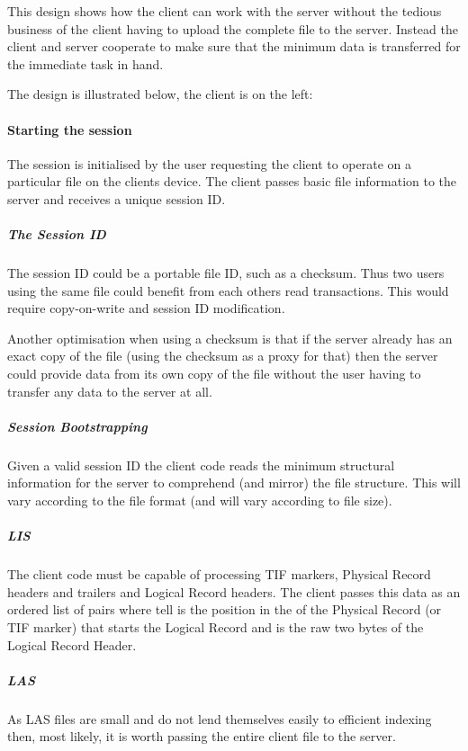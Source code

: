 \documentclass[letterpaper,10pt,english]{sphinxmanual}
\begin{document}
This design shows how the client can work with the server without the tedious business of the client having to upload the complete file to the server. Instead the client and server cooperate to make sure that the minimum data is transferred for the immediate task in hand.

The design is illustrated below, the client is on the left:

\noindent{}


\paragraph{Starting the session}
\label{\detokenize{tech/saas:starting-the-session}}
The session is initialised by the user requesting the client to operate on a particular file on the clients device. The client passes basic file information to the server and receives a unique session ID.


\subparagraph{The Session ID}
\label{\detokenize{tech/saas:the-session-id}}
The session ID could be a portable file ID, such as a checksum. Thus two users using the same file could benefit from each others read transactions. This would require copy-on-write and session ID modification.

Another optimisation when using a checksum is that if the server already has an exact copy of the file (using the checksum as a proxy for that) then the server could provide data from its own copy of the file without the user having to transfer any data to the server at all.


\subparagraph{Session Bootstrapping}
\label{\detokenize{tech/saas:session-bootstrapping}}
Given a valid session ID the client code reads the minimum structural information for the server to comprehend (and mirror) the file structure. This will vary according to the file format (and will vary according to file size).


\subparagraph{LIS}
\label{\detokenize{tech/saas:lis}}
The client code must be capable of processing TIF markers, Physical Record headers and trailers and Logical Record headers. The client passes this data as an ordered list of pairs  where tell is the  position in the of the Physical Record (or TIF marker) that starts the Logical Record and  is the raw two bytes of the Logical Record Header.


\subparagraph{LAS}
\label{\detokenize{tech/saas:las}}
As LAS files are small and do not lend themselves easily to efficient indexing then, most likely, it is worth passing the
entire client file to the server.
\end{document}
